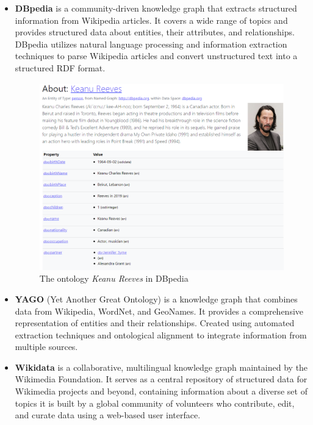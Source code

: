 \begin{itemize}
    \item \textbf{DBpedia} is a community-driven knowledge graph that extracts structured information from Wikipedia articles. It covers a wide range of topics and provides structured data about entities, their attributes, and relationships. DBpedia utilizes natural language processing and information extraction techniques to parse Wikipedia articles and convert unstructured text into a structured RDF format.
    
    \begin{figure}[!h]
        \centering
        \includegraphics[width=\textwidth]{fig/kgs/Keanu_DBpedia.png}
        \caption{The ontology \textit{Keanu Reeves} in DBpedia}
        \label{fig:kgs-dbpedia}
    \end{figure}
    
    \item \textbf{YAGO} (Yet Another Great Ontology) is a knowledge graph that combines data from Wikipedia, WordNet, and GeoNames. It provides a comprehensive representation of entities and their relationships. Created using automated extraction techniques and ontological alignment to integrate information from multiple sources.
    
    \item \textbf{Wikidata} is a collaborative, multilingual knowledge graph maintained by the Wikimedia Foundation. It serves as a central repository of structured data for Wikimedia projects and beyond, containing information about a diverse set of topics it is built by a global community of volunteers who contribute, edit, and curate data using a web-based user interface.
    

\end{itemize}

